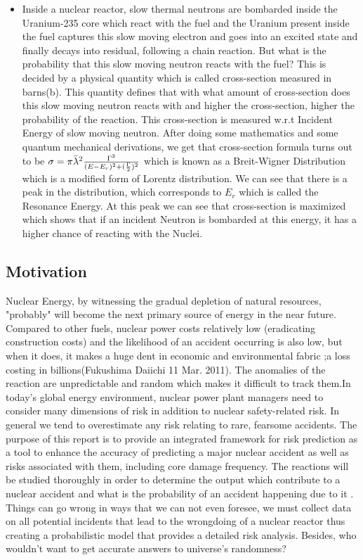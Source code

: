 \documentclass{article}
\begin{document}
\begin{itemize}
    \item Inside a nuclear reactor, slow thermal neutrons are bombarded inside the Uranium-235 core which react with the fuel and the Uranium present inside the fuel captures this slow moving electron and goes into an excited state and finally decays into residual, following a chain reaction. But what is the probability that this slow moving neutron reacts with the fuel? This is decided by a physical quantity which is called cross-section measured in barns(b). This quantity defines that with what amount of cross-section does this slow moving neutron reacts with and higher the cross-section, higher the probability of the reaction. This cross-section is measured w.r.t Incident Energy of slow moving neutron. After doing some mathematics and some quantum mechanical derivations, we get that cross-section formula turns out to be $\sigma = \pi \Bar{\lambda}^2 \frac{\Gamma^2}{(E - E_r)^2 + (\frac{\Gamma}{2})^2}$ which is known as a Breit-Wigner Distribution which is a modified form of Lorentz distribution. We can see that there is a peak in the distribution, which corresponds to $E_r$ which is called the Resonance Energy. At this peak we can see that cross-section is maximized which shows that if an incident Neutron is bombarded at this energy, it has a higher chance of reacting with the Nuclei.
\end{itemize}

\subsection{Motivation}
Nuclear Energy, by witnessing the gradual depletion of natural resources, "probably" will become the next primary source of energy in the near future.
Compared to other fuels, nuclear power costs relatively low (eradicating construction costs) and the likelihood of an accident occurring is also low, but when it does, it makes a huge dent in economic and environmental fabric ;a loss costing in billions(Fukushima Daiichi 11 Mar. 2011). The anomalies of the reaction are unpredictable and random which makes it difficult to track them.In today’s global energy environment, nuclear power plant managers need to consider many dimensions of risk in addition to nuclear safety-related risk.  In general we tend to overestimate any risk relating to rare, fearsome accidents. The purpose of this report is to provide an integrated framework for risk prediction as a tool to enhance the accuracy of predicting a major nuclear accident as well as risks associated with them, including core damage frequency. The reactions will be studied thoroughly in order to determine the output which contribute to a nuclear accident and what is the probability of an accident happening due to it . Things can go wrong in ways that we can not even foresee, we must collect data on all potential incidents that lead to the wrongdoing of a nuclear reactor thus creating a probabilistic model that provides a detailed risk analysis. Besides, who wouldn't want to get accurate answers to  universe's randomness?
\end{document}
